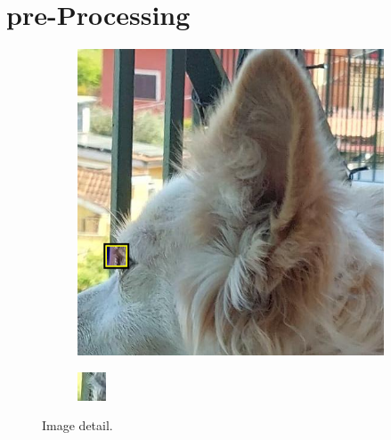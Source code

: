\newpage
\section{pre-Processing}
\begin{figure}[H]
    \centering
    \begin{subfigure}{0.4\linewidth}
        \includegraphics[width=\linewidth]{Figures/example_square.png}
    \end{subfigure}
    \hspace{2cm}
    \begin{subfigure}{0.4\linewidth}
        \includegraphics[width=\linewidth]{Figures/example_detail.png}
    \end{subfigure}
    \caption[Pixel grid detail]{Image detail.}
    \label{fig:example_detail}
\end{figure}

